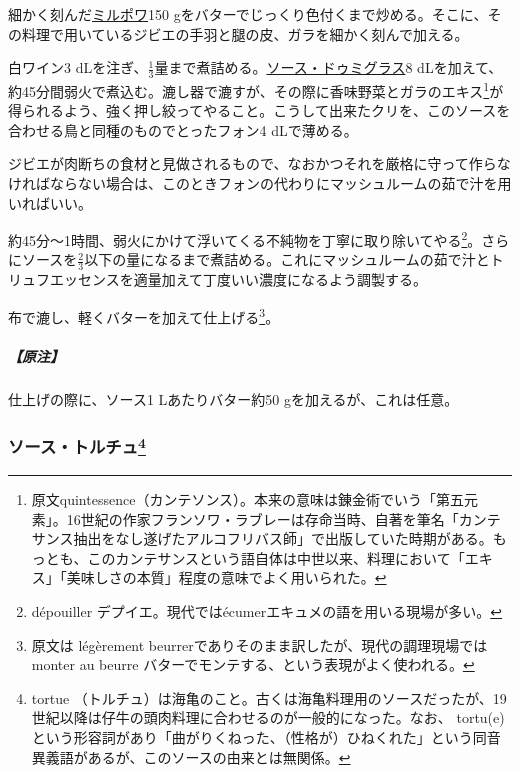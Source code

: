 \begin{recette}
細かく刻んだ\protect\hyperlink{mirepoix}{ミルポワ}150
gをバターでじっくり色付くまで炒める。そこに、その料理で用いているジビエの手羽と腿の皮、ガラを細かく刻んで加える。

白ワイン3
dLを注ぎ、\(\frac{1}{3}\)量まで煮詰める。\protect\hyperlink{sauce-demi-glace}{ソース・ドゥミグラス}8
dLを加えて、約45分間弱火で煮込む。漉し器で漉すが、その際に香味野菜とガラのエキス\footnote{原文quintessence（カンテソンス）。本来の意味は錬金術でいう「第五元素」。16世紀の作家フランソワ・ラブレーは存命当時、自著を筆名「カンテサンス抽出をなし遂げたアルコフリバス師」で出版していた時期がある。もっとも、このカンテサンスという語自体は中世以来、料理において「エキス」「美味しさの本質」程度の意味でよく用いられた。}が得られるよう、強く押し絞ってやること。こうして出来たクリを、このソースを合わせる鳥と同種のものでとったフォン4
dLで薄める。

ジビエが肉断ちの食材と見做されるもので、なおかつそれを厳格に守って作らなければならない場合は、このときフォンの代わりにマッシュルームの茹で汁を用いればいい。

約45分〜1時間、弱火にかけて浮いてくる不純物を丁寧に取り除いてやる\footnote{dépouiller
  デプイエ。現代ではécumerエキュメの語を用いる現場が多い。}。さらにソースを\(\frac{2}{3}\)以下の量になるまで煮詰める。これにマッシュルームの茹で汁とトリュフエッセンスを適量加えて丁度いい濃度になるよう調製する。

布で漉し、軽くバターを加えて仕上げる\footnote{原文は légèrement
  beurrerでありそのまま訳したが、現代の調理現場ではmonter au beurre
  バターでモンテする、という表現がよく使われる。}。

\hypertarget{nota-sauce-salmis}{%
\subparagraph{【原注】}\label{nota-sauce-salmis}}

仕上げの際に、ソース1 Lあたりバター約50 gを加えるが、これは任意。

\hypertarget{sauce-tortue}{%
\subsubsection[ソース・トルチュ]{\texorpdfstring{ソース・トルチュ\footnote{tortue
  （トルチュ）は海亀のこと。古くは海亀料理用のソースだったが、19世紀以降は仔牛の頭肉料理に合わせるのが一般的になった。なお、
  tortu(e)という形容詞があり「曲がりくねった、（性格が）ひねくれた」という同音異義語があるが、このソースの由来とは無関係。}}{ソース・トルチュ}}\label{sauce-tortue}}




\end{recette}
